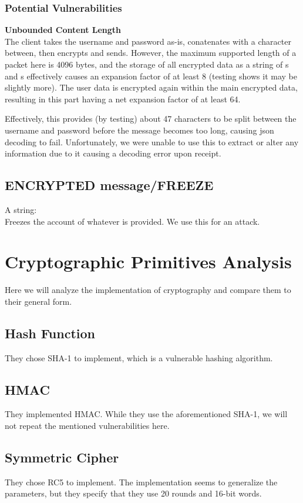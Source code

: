 \documentclass{article}
\newcommand{\code}[1]{\tcbox[
    on line,
    colback=codebackground, boxsep=2pt,
    colframe=white, boxrule=0pt,
    top=0pt, bottom=0pt, left=0pt, right=0pt
]{\texttt{#1}}}
\begin{document}
\subsubsection{Potential Vulnerabilities}
\textbf{Unbounded Content Length} \\
The client takes the username and password as-is, conatenates with a \code{/} character between, then encrypts and sends.
However, the maximum supported length of a packet here is 4096 bytes,
and the storage of all encrypted data as a string of \code{1}s and \code{0}s effectively causes an expansion factor
of at least 8 (testing shows it may be slightly more). The user data is encrypted again within the main encrypted data,
resulting in this part having a net expansion factor of at least 64.

Effectively, this provides (by testing) about 47 characters to be split between the username and password before
the message becomes too long, causing json decoding to fail.
Unfortunately, we were unable to use this to extract or alter any information due to it causing a decoding error upon receipt.

\subsection{ENCRYPTED message/FREEZE}
A string: \code{\textit{username}} \\
Freezes the account of whatever \code{username} is provided.
We use this for an attack.

\section{Cryptographic Primitives Analysis}
Here we will analyze the implementation of cryptography and compare them to their general form.
\subsection{Hash Function}
They chose SHA-1 to implement, which is a vulnerable hashing algorithm.

\subsection{HMAC}
They implemented HMAC. While they use the aforementioned SHA-1, we will not repeat the mentioned vulnerabilities here.

\subsection{Symmetric Cipher}
They chose RC5 to implement. The implementation seems to generalize the parameters, but they specify that they use 20 rounds and 16-bit words.
\end{document}
